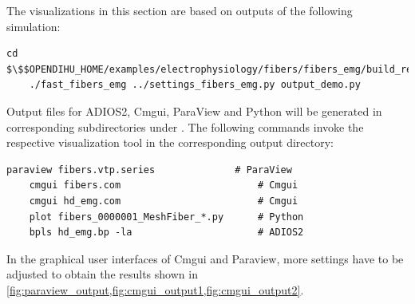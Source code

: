 \begin{reproduce_no_break}
  The visualizations in this section are based on outputs of the following simulation:
  \begin{lstlisting}[columns=fullflexible,breaklines=true,postbreak=\mbox{\textcolor{gray}{$\hookrightarrow$}\space}]
    cd $\$$OPENDIHU_HOME/examples/electrophysiology/fibers/fibers_emg/build_release
    ./fast_fibers_emg ../settings_fibers_emg.py output_demo.py
  \end{lstlisting}
  
  Output files for ADIOS2, Cmgui, ParaView and Python will be generated in corresponding subdirectories under .
  The following commands invoke the respective visualization tool in the corresponding output directory:
  \begin{lstlisting}[columns=fullflexible,breaklines=true,postbreak=\mbox{\textcolor{gray}{$\hookrightarrow$}\space}]
    paraview fibers.vtp.series              # ParaView
    cmgui fibers.com                        # Cmgui
    cmgui hd_emg.com                        # Cmgui
    plot fibers_0000001_MeshFiber_*.py      # Python
    bpls hd_emg.bp -la                      # ADIOS2
  \end{lstlisting}
  In the graphical user interfaces of Cmgui and Paraview, more settings have to be adjusted to obtain the results shown in \cref{fig:paraview_output,fig:cmgui_output1,fig:cmgui_output2}.
\end{reproduce_no_break}


